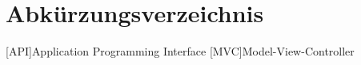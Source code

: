 \clearpage
\chapter*{Abkürzungsverzeichnis}	

\begin{acronym}[XXXXXXX]
	[API]{Application Programming Interface}
	[MVC]{Model-View-Controller}
\end{acronym}